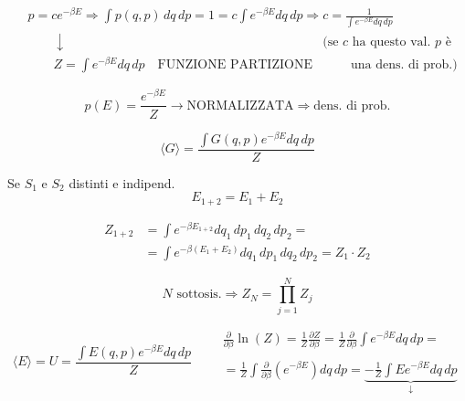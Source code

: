 \documentclass[12pt,a4paper]{article}
\begin{document}
\vspace{0.5cm}
\begin{align*}
    & p = c e^{-\beta E} \Rightarrow \int p(q, p) \, dq \, dp = 1 = c \int e^{-\beta E} dq \, dp \Rightarrow c = \frac{1}{\int e^{-\beta E} dq \, dp} \\
    & \qquad \downarrow \qquad\qquad\qquad\qquad\qquad\qquad\qquad\qquad\qquad\qquad \text{(se } c \text{ ha questo val. } p \text{ è} \\
    & \qquad Z = \int e^{-\beta E} dq \, dp \quad \text{FUNZIONE PARTIZIONE} \qquad\quad \text{una dens. di prob.)}
\end{align*}

\begin{equation*}
    p(E) = \frac{e^{-\beta E}}{Z} \rightarrow \text{NORMALIZZATA} \Rightarrow \text{dens. di prob.}
\end{equation*}

\begin{equation*}
    \boxed{ \langle G \rangle = \frac{\int G(q, p) e^{-\beta E} dq \, dp}{Z} }
\end{equation*}

\newpage

\noindent Se $S_1$ e $S_2$ distinti e indipend.
\begin{equation*}
    E_{1+2} = E_1 + E_2
\end{equation*}

\begin{align*}
    Z_{1+2} &= \int e^{-\beta E_{1+2}} dq_1 \, dp_1 \, dq_2 \, dp_2 = \\
    &= \int e^{-\beta (E_1 + E_2)} dq_1 \, dp_1 \, dq_2 \, dp_2 = Z_1 \cdot Z_2
\end{align*}

\begin{equation*}
    N \text{ sottosis.} \Rightarrow Z_N = \prod_{j=1}^N Z_j
\end{equation*}

\vspace{0.5cm}
\begin{equation*}
    \langle E \rangle = U = \frac{\int E(q, p) e^{-\beta E} dq \, dp}{Z} \qquad 
    \begin{array}{|l}
        \frac{\partial}{\partial \beta} \ln(Z) = \frac{1}{Z} \frac{\partial Z}{\partial \beta} = \frac{1}{Z} \frac{\partial}{\partial \beta} \int e^{-\beta E} dq \, dp = \\
        \\
        = \frac{1}{Z} \int \frac{\partial}{\partial \beta} (e^{-\beta E}) dq \, dp = \underbrace{ - \frac{1}{Z} \int E e^{-\beta E} dq \, dp }_{\downarrow}
    \end{array}
\end{equation*}
\end{document}
